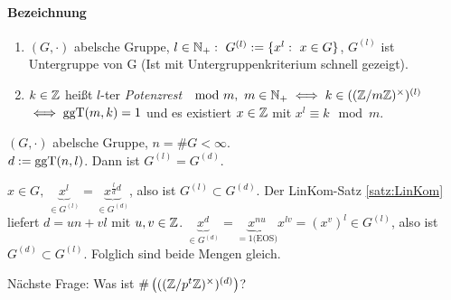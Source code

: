 \documentclass[a4paper,DIV15,BCOR12mm]{article}
\begin{document}
\paragraph{Bezeichnung}
\begin{enumerate}
    \item $(G,\cdot)$ abelsche Gruppe, $l\in\MdN_+:\ G^{(l)}:=\{x^l:\ x\in
    G\}$, $G^{(l)}$ ist Untergruppe von G (Ist mit
    Untergruppenkriterium schnell gezeigt).
    \item $k\in \mathbb{Z}$ heißt $l$-ter \emph{Potenzrest} $\mod m,\ m\in
    \mathbb{N}_+ \iff k\in((\mathbb{Z} / m \mathbb{Z})^{\times})^{(l)}$ $\iff
    \mathop{\rm ggT}\nolimits(m,k)=1$ und es existiert $x\in \mathbb{Z}$ mit $x^l \equiv k \mod
    m$.
\end{enumerate}
\begin{lemma}
    $(G,\cdot)$ abelsche Gruppe, $n=\#G<\infty$.\\
    $d:=\mathop{\rm ggT}\nolimits(n,l)$. Dann ist $G^{(l)}=G^{(d)}$.
\end{lemma}
\begin{beweis}
    $x\in G,\ \underbrace{x^l}_{\in
    G^{(l)}}=\underbrace{x^{\frac{l}{d}d}}_{\in G^{(d)}}$, also ist
    $G^{(l)} \subset G^{(d)}$. Der LinKom-Satz
    \ref{satz:LinKom} liefert $d=un+vl$ mit $u,v\in\mathbb{Z}$.
    $\underbrace{x^d}_{\in G^{(d)}}=\underbrace{x^{nu}}_{=1
    \text{(EOS)}} x^{lv}=(x^v)^l \in G^{(l)}$, also ist
    $G^{(d)}\subset G^{(l)}$. Folglich sind beide Mengen gleich.
\end{beweis}
Nächste Frage: Was ist $\#\left( ((\mathbb{Z}/p^t\mathbb{Z})^{\times})^{(d)}
\right)$?\\
\end{document}
